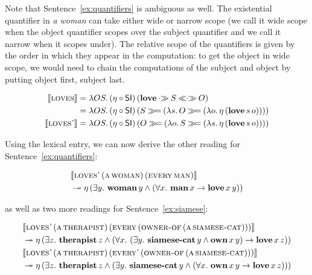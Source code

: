Note that Sentence~\ref{ex:quantifiers} is ambiguous as well. The
existential quantifier in \emph{a woman} can take either wide or narrow
scope (we call it wide scope when the object quantifier scopes over the
subject quantifier and we call it narrow when it scopes under). The
relative scope of the quantifiers is given by the order in which they
appear in the computation: to get the object in wide scope, we would need
to chain the computations of the subject and object by putting object
first, subject last.

\begin{align*}
\lex{loves}{\lam{O S}{\ap{(\eta \circ \SI)}{(\obj{love} \apr S \aplr O)}}} \\
&= \lam{O S}{\ap{(\eta \circ \SI)}{(S \hsbind (\lam{s}{O \hsbind
  (\lam{o}{\etaE{(\app{\obj{love}}{s}{o})}})}))}} \\
\lex{loves'}{\lam{O S}{\ap{(\eta \circ \SI)}{(O \hsbind (\lam{o}{S \hsbind
  (\lam{s}{\etaE{(\app{\obj{love}}{s}{o})}})}))}}}
\end{align*}

Using the lexical entry, we can now derive the other reading for
Sentence~\ref{ex:quantifiers}:

\addtocounter{equation}{-2}
\NoChapterPrefix
\begin{align}
& \sem{\app{\abs{loves'}}{(\ap{\abs{a}}{\abs{woman}})}{(\ap{\abs{every}}{\abs{man}})}} \nonumber \\
&\tto \etaE{(\exists y.\ \ap{\obj{woman}}{y} \land (\forall x.\ \ap{\obj{man}}{x} \to \app{\obj{love}}{x}{y}))}
\end{align}
\ChapterPrefix
\addtocounter{equation}{1}

as well as two more readings for Sentence~\ref{ex:siamese}:

\addtocounter{equation}{-1}
\NoChapterPrefix
\begin{align}
& \sem{\app{\abs{loves'}}{(\ap{\abs{a}}{\abs{therapist}})}{(\ap{\abs{every}}{(\ap{\abs{owner-of}}{(\ap{\abs{a}}{\abs{siamese-cat}})})})}} \nonumber \\
&\tto \etaE{(\exists z.\ \ap{\obj{therapist}}{z} \land (\forall x.\ (\exists y.\ \ap{\obj{siamese-cat}}{y} \land \app{\obj{own}}{x}{y}) \to \app{\obj{love}}{x}{z}))} \\
\addtocounter{equation}{-1}
& \sem{\app{\abs{loves'}}{(\ap{\abs{a}}{\abs{therapist}})}{(\ap{\abs{every'}}{(\ap{\abs{owner-of}}{(\ap{\abs{a}}{\abs{siamese-cat}})})})}} \nonumber \\
&\tto \etaE{(\exists z.\ \ap{\obj{therapist}}{z} \land (\exists y.\ \ap{\obj{siamese-cat}}{y} \land (\forall x.\ \app{\obj{own}}{x}{y} \to \app{\obj{love}}{x}{z})))}
\end{align}
\ChapterPrefix


